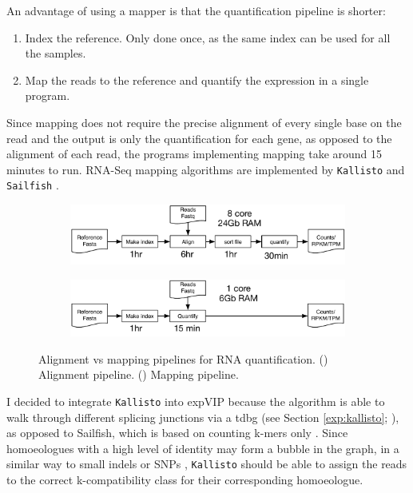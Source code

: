 An advantage of using a mapper is that the quantification pipeline is shorter:
\begin{enumerate}
  \item Index the reference. Only done once, as the same index can be used for all the samples. 
  \item Map the reads to the reference and quantify the expression in a single program.   
\end{enumerate}
Since mapping does not require the precise alignment of every single base on the read and the output is only the quantification for each gene, as opposed to the alignment of each read, the programs implementing mapping take around 15 minutes to run. 
RNA-Seq mapping algorithms are implemented by \verb|Kallisto|  \citep{Bray2016} and \verb|Sailfish| \citep{Patro2014}.

\begin{figure}
\begin{subfigure}{1\textwidth}
\caption{}
\label{fig:exp:alnPipeline}
\includegraphics[width=1\textwidth]{expVIP/Figures/alnpipeline.pdf}
\end{subfigure}

\begin{subfigure}{1\textwidth}
\caption{}
\label{fig:exp:mapPipeline}
\includegraphics[width=1\textwidth]{expVIP/Figures/mappipeline.pdf}
\end{subfigure}

\caption[Alignment vs mapping pipelines]{Alignment vs mapping pipelines for RNA quantification. () Alignment pipeline. () Mapping pipeline.}
\label{fig:exp:alnVSmap}
\end{figure} 

I decided to integrate \verb|Kallisto|  into expVIP because the algorithm is able to walk through different splicing junctions via a \acrshort{tdbg} (see Section \ref{exp:kallisto}; \citealt{Bray2016}), as opposed to Sailfish, which is based on counting k-mers only \citep{Patro2014}. 
Since homoeologues with a high level of identity may form a bubble in the graph, in a similar way to small indels or SNPs \citep{Leggett2013}, \verb|Kallisto|  should be able to assign the reads to the correct k-compatibility class for their corresponding homoeologue.  

